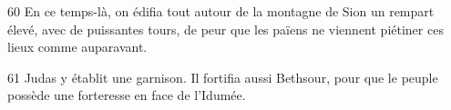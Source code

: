 
60 En ce temps-là, on édifia tout autour de la montagne de Sion un rempart élevé, avec de puissantes tours, de peur que les païens ne viennent piétiner ces lieux comme auparavant.

61 Judas y établit une garnison. Il fortifia aussi Bethsour, pour que le peuple possède une forteresse en face de l’Idumée.